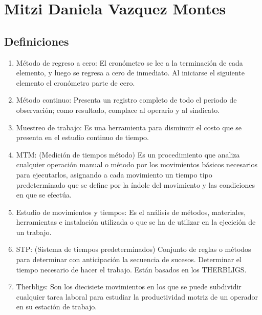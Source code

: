 \section{Mitzi Daniela Vazquez Montes}
\subsection{Definiciones}
\begin{enumerate}
    \item Método de regreso a cero: El cronómetro se lee a la terminación de cada elemento, y luego se regresa a cero de inmediato. Al iniciarse el siguiente elemento el cronómetro parte de cero.
    \item Método continuo: Presenta un registro completo de todo el periodo de observación; como resultado, complace al operario y al sindicato.
    \item Muestreo de trabajo: Es una herramienta para disminuir el costo que se presenta en el estudio continuo de tiempo.
    \item MTM: (Medición de tiempos método) Es un procedimiento que analiza cualquier operación manual o método por los movimientos básicos necesarios para ejecutarlos, asignando a cada movimiento un tiempo tipo predeterminado que se define por la índole del movimiento y las condiciones en que se efectúa.
    \item Estudio de movimientos y tiempos: Es el análisis de métodos, materiales, herramientas e instalación utilizada o que se ha de utilizar en la ejecición de un trabajo.
    \item STP: (Sistema de tiempos predeterminados) Conjunto de reglas o métodos para determinar con anticipación la secuencia de sucesos. Determinar el tiempo necesario de hacer el trabajo. Están basados en los THERBLIGS.
    \item Therbligs: Son los diecisiete movimientos en los que se puede subdividir cualquier tarea laboral para estudiar la productividad motriz de un operador en su estación de trabajo.
    
\end{enumerate}
